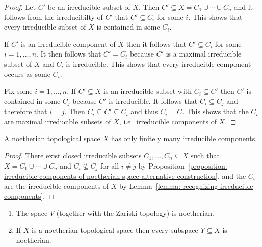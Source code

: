 \begin{proof}
  Let $C'$ be an irreducible subset of $X$.
  Then $C' \subseteq X = C_1 \cup \dotsb \cup C_n$ and it follows from the irreducibilty of $C'$ that $C' \subseteq C_i$ for some $i$.
  This shows that every irreducible subset of $X$ is contained in some $C_i$.
  
  If $C'$ is an irreducible component of $X$ then it follows that $C' \subseteq C_i$ for some $i = 1, \dotsc, n$.
  It then follows that $C' = C_i$ because $C'$ is a maximal irreducible subset of $X$ and $C_i$ is irreducible.
  This shows that every irreducible component occurs as some $C_i$.
  
  Fix some $i = 1, \dotsc, n$.
  If $C' \subseteq X$ is an irreducible subset with $C_i \subseteq C'$ then $C'$ is contained in some $C_j$ because $C'$ is irreducible.
  It follows that $C_i \subseteq C_j$ and therefore that $i = j$.
  Then $C_i \subseteq C' \subseteq C_i$ and thus $C_i = C$.
  This shows that the $C_i$ are maximal irreducible subsets of $X$, i.e.\ irreducible components of $X$.
\end{proof}


\begin{corollary}
  \label{corollary: noetherian spaces have only finitely many irreducible components}
  A noetherian topological space $X$ has only finitely many irreducible components.
\end{corollary}


\begin{proof}
  There exist closed irreducible subsets $C_1, \dotsc, C_n \subseteq X$ such that $X = C_1 \cup \dotsb \cup C_n$ and $C_i \nsubseteq C_j$ for all $i \neq j$ by Proposition~\ref{proposition: irreducible components of noetherian space alternative construction}, and the $C_i$ are the irreducible components of $X$ by Lemma~\ref{lemma: recognizing irreducible components}.
\end{proof}


\begin{lemma}
  \label{lemma: algebraic spaces are noetherian}
  \leavevmode
  \begin{enumerate}
    \item
      The space $V$ (together with the Zariski topology) is noetherian.
    \item
      If $X$ is a noetherian topological space then every subspace $Y \subseteq X$ is noetherian.
  \end{enumerate}
\end{lemma}


